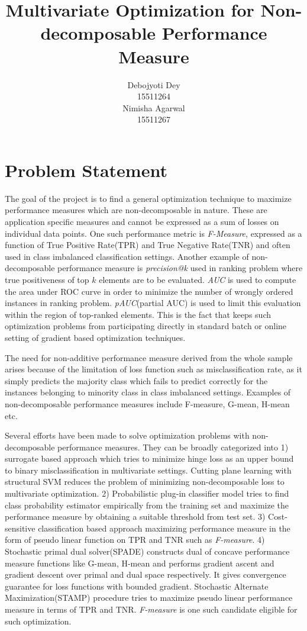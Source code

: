 \documentclass{article} %
\title{Multivariate Optimization for Non-decomposable Performance Measure}
\author{
Debojyoti Dey \\
15511264 \\
\And
Nimisha Agarwal \\
15511267 \\
}
\begin{document}
\maketitle

\section{Problem Statement}

The goal of the project is to find a general optimization technique to maximize performance measures which are non-decomposable in nature. These are application specific measures and cannot be expressed as a sum of losses on individual data points. One such performance metric is \textit{F-Measure}, expressed as a function of True Positive Rate(TPR) and True Negative Rate(TNR) and often used in class imbalanced classification settings. Another example of non-decomposable performance measure is \textit{precision@k} used in ranking problem where true positiveness of top $k$ elements are to be evaluated. \textit{AUC} is used to compute the area under ROC curve in order to minimize the number of wrongly ordered instances in ranking problem. \textit{pAUC}(partial AUC) is used to limit this evaluation within the region of top-ranked elements. This is the fact that keeps such optimization problems from participating directly in standard batch or online setting of gradient based optimization techniques.

The need for non-additive performance measure derived from the whole sample arises because of the limitation of loss function such as misclassification rate, as it simply predicts the majority class which fails to predict correctly for the instances belonging to minority class in class imbalanced settings. Examples of non-decomposable performance measures include F-measure, G-mean, H-mean etc.

Several efforts have been made to solve optimization problems with non-decomposable performance measures. They can be broadly categorized into 1) surrogate based approach which tries to minimize hinge loss as an upper bound to binary misclassification in multivariate settings. Cutting plane learning with structural SVM \cite{c1} reduces the problem of minimizing non-decomposable loss to multivariate optimization. 2) Probabilistic plug-in classifier\cite{c3} model tries to find class probability estimator empirically from the training set and maximize the performance measure by obtaining a suitable threshold from test set. 3) Cost-sensitive classification based approach\cite{c6} maximizing performance measure in the form of pseudo linear function on TPR and TNR such as \textit{F-measure}. 4) Stochastic primal dual solver(SPADE)\cite{c2} constructs dual of concave performance measure functions like G-mean, H-mean and performs gradient ascent and gradient descent over primal and dual space respectively. It gives convergence guarantee for loss functions with bounded gradient. Stochastic Alternate Maximization(STAMP)\cite{c2} procedure tries to maximize pseudo linear performance measure in terms of TPR and TNR. \textit{F-measure} is one such candidate eligible for such optimization.
\end{document}
